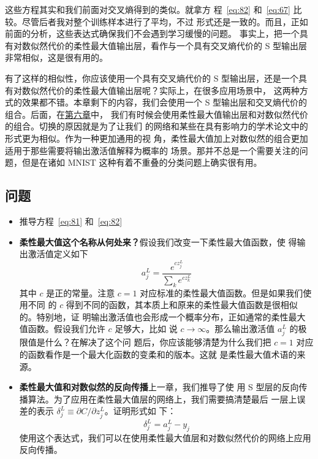 这些方程其实和我们前面对交叉熵得到的类似。就拿方
程~\eqref{eq:82} 和~\eqref{eq:67} 比较。尽管后者我对整个训练样本进行了平均，不过
形式还是一致的。而且，正如前面的分析，这些表达式确保我们不会遇到学习缓慢的问题。
事实上，把一个具有对数似然代价的柔性最大值输出层，看作与一个具有交叉熵代价的 S 型输出层非常相似，这是很有用的。

有了这样的相似性，你应该使用一个具有交叉熵代价的 S 型输出层，还是一个具有对数似然代价的柔性最大值输出层呢？实际上，在很多应用场景中，
这两种方式的效果都不错。本章剩下的内容，我们会使用一个 S 型输出层和交叉熵代价的组合。后面，在\hyperref[ch:Deeplearning]{第六章}中，
我们有时候会使用柔性最大值输出层和对数似然代价的组合。切换的原因就是为了让我们
的网络和某些在具有影响力的学术论文中的形式更为相似。作为一种更加通用的视
角，柔性最大值加上对数似然的组合更加适用于那些需要将输出激活值解释为概率的
场景。那并不总是一个需要关注的问题，但是在诸如 MNIST 这种有着不重叠的分类问题上确实很有用。

\subsection*{问题}

\begin{itemize}
\item 推导方程~\eqref{eq:81} 和~\eqref{eq:82}
\item \textbf{柔性最大值这个名称从何处来？}\quad 假设我们改变一下柔性最大值函数，使
  得输出激活值定义如下
  \begin{equation}
    a^L_j = \frac{e^{c z^L_j}}{\sum_k e^{c z^L_k}}
    \label{eq:83}\tag{83}
  \end{equation}
  其中 $c$ 是正的常量。注意 $c=1$ 对应标准的柔性最大值函数。但是如果我们使用不同
  的 $c$ 得到不同的函数，其本质上和原来的柔性最大值函数是很相似的。特别地，证
  明输出激活值也会形成一个概率分布，正如通常的柔性最大值函数。假设我们允许 $c$ 足够大，比如
  说 $c\rightarrow \infty$。那么输出激活值 $a_j^L$ 的极限值是什么？在解决了这个问
  题后，你应该能够清楚为什么我们把 $c=1$ 对应的函数看作是一个最大化函数的变柔和的版本。这就
  是柔性最大值术语的来源。
\item \textbf{柔性最大值和对数似然的反向传播}\quad 上一章，我们推导了使
  用 S 型层的反向传播算法。为了应用在柔性最大值层的网络上，我们需要搞清楚最后
  一层上误差的表示 $\delta^L_j \equiv \partial C / \partial z^L_j$。证明形式如
  下：
  \begin{equation}
    \delta^L_j = a^L_j -y_j
    \label{eq:84}\tag{84}
  \end{equation}
  使用这个表达式，我们可以在使用柔性最大值层和对数似然代价的网络上应用反向传播。
\end{itemize}

